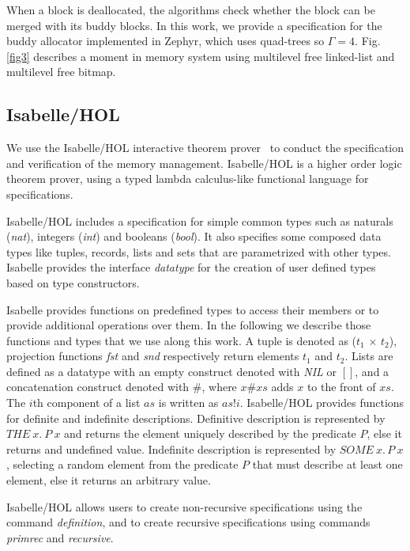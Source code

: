 When a block is deallocated, the algorithms check whether the block can be merged with its buddy blocks. In this work, we provide a specification for the buddy allocator implemented in Zephyr, which uses quad-trees so $\Gamma = 4$.  Fig. \ref{fig3} describes a moment in memory system using multilevel free linked-list and multilevel free bitmap.



\subsection{Isabelle/HOL}
We use {the Isabelle/HOL interactive theorem prover}~\cite{reg_Isabelle/HOL} to conduct the specification and verification of the memory management. Isabelle/HOL is a higher order logic theorem prover, using a typed lambda calculus-like functional language for specifications.

Isabelle/HOL includes a specification for simple common types such as naturals (\emph{nat}), integers (\emph{int}) and booleans (\emph{bool}). It also specifies some composed data types like tuples, records, lists and sets that are parametrized with other types. Isabelle provides the interface \emph{datatype} for the creation of user defined types based on type constructors. 

Isabelle provides functions on predefined types to access their members or to provide additional operations over them. In the following we describe those functions and types that we use along this work. A tuple is denoted as (\emph{$t_1$} $\times$ \emph{$t_2$}), projection functions \emph{fst} and \emph{snd} respectively return elements $t_1$ and $t_2$. Lists are defined as a datatype with an empty construct denoted with \emph{NIL} or $[]$, and a concatenation construct denoted with $\#$, where $x\#xs$ adds $x$ to the front of $xs$. The $i$th component of a list $as$ is written as $as!i$. Isabelle/HOL provides functions for definite and indefinite descriptions. Definitive description is represented by $THE\ x.\ P\ x$ and returns the element uniquely described by the predicate $P$, else it returns and undefined value. Indefinite description is represented by $SOME\ x.\, P\ x$, selecting a random element from the predicate $P$ that must describe at least one element, else it returns an arbitrary value.

Isabelle/HOL allows {users} to create non-recursive specifications using the command \emph{definition}, and to create recursive specifications using commands \emph{primrec} and \emph{recursive}.
